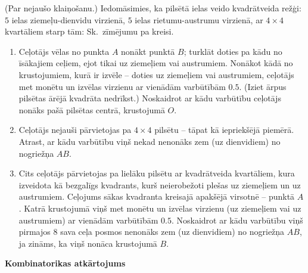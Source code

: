 \documentclass[a4paper,12pt]{article}
\begin{document}
\vspace{10pt}
\begin{problem}
(Par nejaušo klaiņošanu.) 
Iedomāsimies, ka pilsētā ielas veido kvadrātveida režģi: 
$5$ ielas ziemeļu-dienvidu virzienā, 
$5$ ielas rietumu-austrumu virzienā, ar $4 \times 4$ kvartāliem starp tām: 
Sk.\ zīmējumu pa kreisi.


\begin{enumerate}
\item Ceļotājs vēlas no punkta $A$ nonākt punktā $B$; turklāt doties 
pa kādu no īsākajiem ceļiem, ejot tikai uz ziemeļiem vai austrumiem. 
Nonākot kādā no krustojumiem, kurā ir izvēle -- doties uz ziemeļiem vai austrumiem, 
ceļotājs met monētu un izvēlas virzienu ar vienādām varbūtībām $0.5$. 
(Iziet ārpus pilsētas ārējā kvadrāta nedrīkst.)
Noskaidrot ar kādu varbūtību ceļotājs nonāks pašā pilsētas centrā, krustojumā $O$. 
\item Ceļotājs nejauši pārvietojas pa $4 \times 4$ pilsētu -- tāpat kā iepriekšējā 
piemērā. 
Atrast, ar kādu varbūtību viņš nekad nenonāks zem (uz dienvidiem) no nogriežņa $AB$. 
\item Cits ceļotājs pārvietojas pa lielāku pilsētu ar kvadrātveida kvartāliem, 
kura izveidota kā bezgalīgs
kvadrants, kurš neierobežoti plešas uz ziemeļiem un uz austrumiem. 
Ceļojums sākas kvadranta kreisajā apakšējā 
virsotnē -- punktā $A$. Katrā krustojumā viņš met 
monētu un izvēlas virzienu (uz ziemeļiem vai uz austrumiem) ar vienādām varbūtībām $0.5$. 
Noskaidrot ar kādu varbūtību viņš pirmajos $8$ sava ceļa posmos nenonāks zem (uz dienvidiem) no nogriežņa
$AB$, ja zināms, ka viņš nonāca krustojumā $B$. 
\end{enumerate}
\end{problem}



\vspace{20pt}
{\Large \bf Kombinatorikas atkārtojums}
\end{document}
